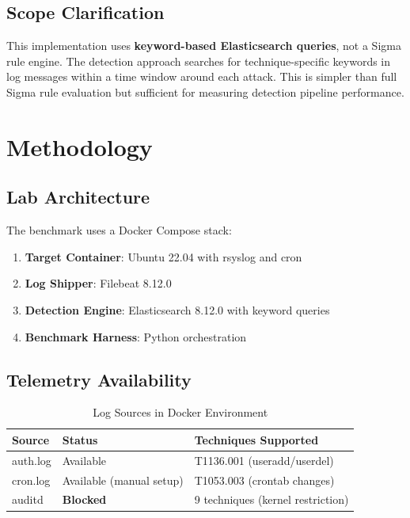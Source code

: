 \documentclass[11pt,a4paper]{article}
\begin{document}
\subsection{Scope Clarification}

This implementation uses \textbf{keyword-based Elasticsearch queries}, not a Sigma rule engine. The detection approach searches for technique-specific keywords in log messages within a time window around each attack. This is simpler than full Sigma rule evaluation but sufficient for measuring detection pipeline performance.

\section{Methodology}

\subsection{Lab Architecture}

The benchmark uses a Docker Compose stack:

\begin{enumerate}
    \item \textbf{Target Container}: Ubuntu 22.04 with rsyslog and cron
    \item \textbf{Log Shipper}: Filebeat 8.12.0
    \item \textbf{Detection Engine}: Elasticsearch 8.12.0 with keyword queries
    \item \textbf{Benchmark Harness}: Python orchestration
\end{enumerate}

\subsection{Telemetry Availability}

\begin{table}[H]
    \centering
    \caption{Log Sources in Docker Environment}
    \begin{tabular}{lll}
        \toprule
        \textbf{Source} & \textbf{Status} & \textbf{Techniques Supported} \\
        \midrule
        auth.log & Available & T1136.001 (useradd/userdel) \\
        cron.log & Available (manual setup) & T1053.003 (crontab changes) \\
        auditd & \textbf{Blocked} & 9 techniques (kernel restriction) \\
        \bottomrule
    \end{tabular}
\end{table}
\end{document}
